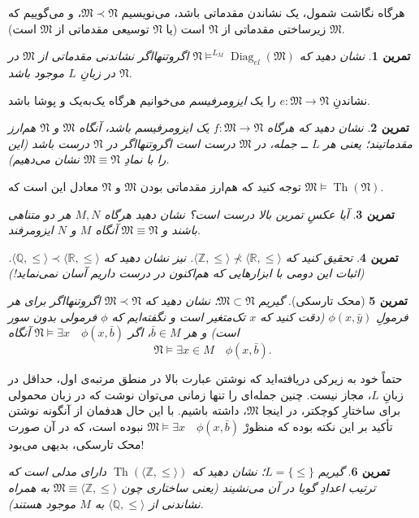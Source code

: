 \documentclass[12pt,a4paper]{report}
\theoremstyle{colorhead}
\newtheorem{tam}{تمرین}
\DeclareMathOperator{\Th}{Th}
\DeclareMathOperator{\diag}{Diag}
\begin{document}
هرگاه نگاشت شمول، یک نشاندن مقدماتی باشد، می‌نویسیم
$\mathfrak{M}\prec \mathfrak{N}$، 
و می‌گوییم که
$\mathfrak{M}$
زیرساختی مقدماتی از
$\mathfrak{N}$
است (یا 
$\mathfrak{N}$
توسیعی مقدماتی از
$\mathfrak{M}$
است).
\begin{tam}
نشان دهید که 
$\mathfrak{N}\models^{L_M} \diag_{el}(\mathfrak{M})$
اگروتنهااگر نشاندنی مقدماتی از
$\mathfrak{M}$
در 
$\mathfrak{N}$
در زبانِ
$L$
موجود باشد. 
\end{tam}
نشاندنِ
$e:\mathfrak{M}\to\mathfrak{N}$
را یک 
\textit{ایزومرفیسم }
می‌خوانیم هرگاه یک‌به‌یک و پوشا باشد.
\begin{tam}
نشان دهید که هرگاه
$f:\mathfrak{M}\to \mathfrak{N}$
یک ایزومرفیسم باشد، آنگاه 
$\mathfrak{M}$
و
$\mathfrak{N}$
هم‌ارز مقدماتیند؛ یعنی هر 
$L$ ــ
جمله، در
$\mathfrak{M}$
درست است اگروتنهااگر در
$\mathfrak{N}$
درست باشد (این را با نمادِ
$\mathfrak{M}\equiv \mathfrak{N}$
نشان می‌دهیم).
\end{tam}
توجه کنید که هم‌ارز مقدماتی بودن
$\mathfrak{M}$
و
$\mathfrak{N}$
معادل این است که
$\mathfrak{M}\models \Th(\mathfrak{N})$.
\begin{tam}
آيا عکسِ تمرین بالا درست است؟ نشان دهید هرگاه
$M,N$
هر دو متناهی باشند و
$\mathfrak{M}\equiv \mathfrak{N}$
آنگاه
$M$
و
$N$
ایزومرفند.
\end{tam}
\begin{tam}
تحقیق کنید که
$\langle \mathbb{Z},\leq\rangle \not\prec \langle \mathbb{R},\leq\rangle$.
نیز نشان دهید که
$\langle \mathbb{Q},\leq \rangle\prec \langle \mathbb{R},\leq\rangle$.
(اثبات این دومی با ابزارهایی که هم‌اکنون در درست داریم آسان نمی‌نماید!)
\end{tam}
\begin{tam}[محک تارسکی]
گیریم
$\mathfrak{M}\subset \mathfrak{N}$؛
نشان دهید که
$\mathfrak{M}\prec \mathfrak{N}$
اگروتنهااگر 
برای هر فرمولِ
$\phi(x,\bar{y})$
(دقت کنید که
$x$
تک‌متغیر است و نگفته‌ایم که 
$\phi$
فرمولی بدون سور است)
و هر
$\bar{b}\in M$،
اگر
$\mathfrak{N}\models \exists x \quad \phi(x,\bar{b})$
آنگاه
\[
\mathfrak{N}\models \exists x\in M \quad \phi(x,\bar{b}).
\]
\end{tam}
حتماً خود به زیرکی دریافته‌اید که نوشتن عبارت بالا در منطق مرتبه‌ی اول، حداقل در زبانِ
$L$،
مجاز نیست. چنین جمله‌ای را تنها زمانی می‌توان نوشت که 
در زبان محمولی برای ساختارِ کوچکتر، در اینجا
$\mathfrak{M}$،
داشته باشیم. با این حال هدفمان از آنگونه نوشتن تأکید بر این نکته بوده  که منظورْ 
$\mathfrak{M}\models \exists x \quad \phi(x,\bar{b})$
نبوده است، که در آن صورت محک تارسکی،‌ بدیهی می‌بود!
\begin{tam}
گیریم
$L=\{\leq\}$؛
نشان‌ دهید که
$\Th(\langle \mathbb{Z},\leq\rangle)$
دارای مدلی است که ترتیب اعدادِ گویا در آن می‌نشیند (یعنی 
ساختاری چون
$\mathfrak{M}\equiv \langle \mathbb{Z},\leq\rangle$
به همراه نشاندنی از 
$\langle \mathbb{Q},\leq\rangle$
به
$M$
موجود هستند).
\end{tam}
\end{document}
